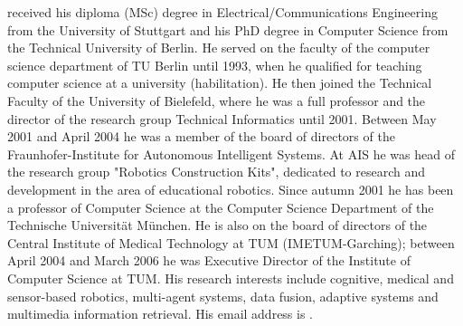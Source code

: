\documentclass{wscpaperproc}
\theoremstyle{wsc}
\begin{document}
 received his diploma (MSc) degree in Electrical/Communications Engineering from the University of Stuttgart and his PhD degree in Computer Science from the Technical University of Berlin. He served on the faculty of the computer science department of TU Berlin until 1993, when he qualified for teaching computer science at a university (habilitation). He then joined the Technical Faculty of the University of Bielefeld, where he was a full professor and the director of the research group Technical Informatics until 2001. Between May 2001 and April 2004 he was a member of the board of directors of the Fraunhofer-Institute for Autonomous Intelligent Systems. At AIS he was head of the research group "Robotics Construction Kits", dedicated to research and development in the area of educational robotics. Since autumn 2001 he has been a professor of Computer Science at the Computer Science Department
of the Technische Universit\"at M\"unchen. He is also on the board of directors of the Central Institute of Medical Technology at TUM (IMETUM-Garching); between April 2004 and March 2006 he was Executive Director of the Institute of Computer Science at TUM. His research interests include cognitive, medical
and sensor-based robotics, multi-agent systems, data fusion, adaptive systems and multimedia information retrieval. His email address is .\\
\end{document}
